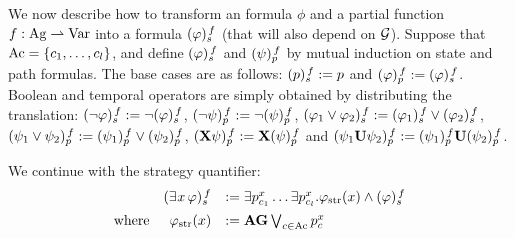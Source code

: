 \halfline
{}
 We now describe how to transform an \SLref formula $\phi$ and a partial
function $f:\Agf \partialto  \Varf$ into a \QCTLs
formula $\tr[f]{\phi}$ (that will also depend on $\CGS$).
Suppose that $\Mov=\{\mov_{1},\ldots,\mov_{\maxmov}\}$, and define
$\tr[f]{\phi}$ and $\trp[f]{\psi}$ by mutual induction on state and path formulas. 
The base cases are as follows:
$\tr[f]{p} 		 \egdef p$ and $\trp[f]{\phi} \egdef
\tr[f]{\phi}$. Boolean and temporal operators are simply obtained by
distributing the translation:
$\tr[f]{\neg \phi} 	 \egdef \neg \tr[f]{\phi}$, $\trp[f]{\neg
  \psi} \egdef \neg \trp[f]{\psi}$,
$\tr[f]{\phi_1\ou\phi_2}  \egdef \tr[f]{\phi_1}\ou\tr[f]{\phi_2}$,
$\trp[f]{\psi_1\ou\psi_2}  \egdef \trp[f]{\psi_1}\ou\trp[f]{\psi_2}$,
$\trp[f]{\X\psi}  \egdef \X\trp[f]{\psi}$ and $\trp[f]{\psi_1\until\psi_2}  \egdef \trp[f]{\psi_1}\until\trp[f]{\psi_2}$.


We continue with the strategy quantifier:
\[
  \begin{array}{lrl}
& \tr[f]{\Estratnd\phi}	& \egdef  \exists
                                  p_{\mov_{1}}^{\var}\ldots
                                  \exists
                                  p_{\mov_{\maxmov}}^{\var}. \phistrat
                                  \et \tr[f]{\phi}\\[5pt]
  \mbox{where} &  \phistrat & \egdef \A\always
                              \bigou_{\mov\in\Mov}p_{\mov}^{\var}
\end{array}
\]

